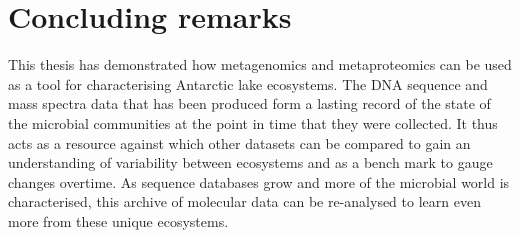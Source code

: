 \section{Concluding remarks}

This thesis has demonstrated how metagenomics and metaproteomics can be used as a tool for characterising Antarctic lake ecosystems.
The \textsc{DNA} sequence and mass spectra data that has been produced form a lasting record of the state of the microbial communities at the point in time that they were collected.
It thus acts as a resource against which other datasets can be compared to gain an understanding of variability between ecosystems and as a bench mark to gauge changes overtime.
As sequence databases grow and more of the microbial world is characterised, this archive of molecular data can be re-analysed to learn even more from these unique ecosystems.
